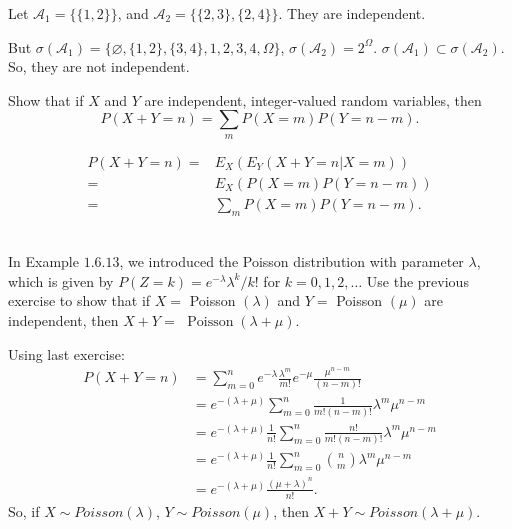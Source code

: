 \documentclass[en, normal, 11pt, black]{elegantnote}
\newenvironment{exercise}[1]{\begin{tcolorbox}[colback=black!15, colframe=black!80, breakable, title=#1]}{\end{tcolorbox}}
\renewenvironment{proof}{\begin{tcolorbox}[colback=white, colframe=black!50, breakable, title=Proof. ]\setlength{\parskip}{0.8em}}{\,\\\rightline{$\square$}\end{tcolorbox}}
\begin{document}
    \begin{proof}
        Let $\mathcal{A}_1=\{\{1,2\}\}$, and $\mathcal{A}_2=\{\{2,3\},\{2,4\}\}$. They are independent. 
        
        But $\sigma(\mathcal{A}_1)=\{\varnothing, \{1,2\},\{3,4\}, {1,2,3,4}, \Omega\}$, $\sigma(\mathcal{A}_2)=2^\Omega$. $\sigma(\mathcal{A}_1)\subset\sigma(\mathcal{A}_2)$. So, they are not independent. 
    \end{proof}

    \begin{exercise}{2.1.10}
        Show that if $X$ and $Y$ are independent, integer-valued random variables, then
        \[
            P(X+Y=n)=\sum_{m} P(X=m) P(Y=n-m). 
        \]
    \end{exercise}

    \begin{proof}
        \[
            \begin{aligned}
                P(X+Y=n)=&E_X\left(E_Y(X+Y=n|X=m)\right)\\
                =&E_X(P(X=m)P(Y=n-m))\\
                =&\sum_mP(X=m)P(Y=n-m). 
            \end{aligned}
        \]
        \vspace*{-30pt}
    \end{proof}

    \begin{exercise}{2.1.11}
        In Example $1.6 .13$, we introduced the Poisson distribution with parameter $\lambda$, which is given by $P(Z=k)=e^{-\lambda} \lambda^{k} / k !$ for $k=0,1,2, \ldots$ Use the previous exercise to show that if $X=$ Poisson $(\lambda)$ and $Y=$ Poisson $(\mu)$ are independent, then $X+Y=$ $\operatorname{Poisson}(\lambda+\mu)$. 
    \end{exercise}

    \begin{proof}
        Using last exercise: 
        \[
            \begin{aligned}
                P(X+Y=n) &=\sum_{m=0}^{n} e^{-\lambda} \frac{\lambda^{m}}{m !} e^{-\mu} \frac{\mu^{n-m}}{(n-m) !} \\
                &=e^{-(\lambda+\mu)} \sum_{m=0}^{n} \frac{1}{m !(n-m) !} \lambda^{m} \mu^{n-m} \\
                &=e^{-(\lambda+\mu)} \frac{1}{n !} \sum_{m=0}^{n} \frac{n !}{m !(n-m) !} \lambda^{m} \mu^{n-m} \\
                &=e^{-(\lambda+\mu)} \frac{1}{n !} \sum_{m=0}^{n} \binom{n}{m} \lambda^{m} \mu^{n-m} \\
                &=e^{-(\lambda+\mu)} \frac{(\mu+\lambda)^{n}}{n !}. 
            \end{aligned}
        \]
        So, if $X\sim Poisson(\lambda)$, $Y\sim Poisson(\mu)$, then $X+Y\sim Poisson(\lambda+\mu)$. 
    \end{proof}
\end{document}
